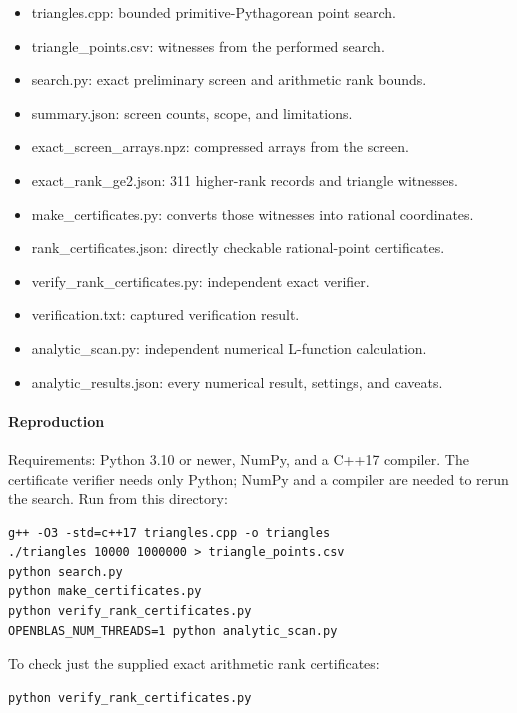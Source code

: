 \documentclass[11pt]{article}
\newcommand{\tightlist}{\setlength{\itemsep}{0pt}\setlength{\parskip}{0pt}}
\begin{document}
\begin{itemize}
\tightlist
\item
  triangles.cpp: bounded primitive-Pythagorean point search.
\item
  triangle\_points.csv: witnesses from the performed search.
\item
  search.py: exact preliminary screen and arithmetic rank bounds.
\item
  summary.json: screen counts, scope, and limitations.
\item
  exact\_screen\_arrays.npz: compressed arrays from the screen.
\item
  exact\_rank\_ge2.json: 311 higher-rank records and triangle witnesses.
\item
  make\_certificates.py: converts those witnesses into rational coordinates.
\item
  rank\_certificates.json: directly checkable rational-point certificates.
\item
  verify\_rank\_certificates.py: independent exact verifier.
\item
  verification.txt: captured verification result.
\item
  analytic\_scan.py: independent numerical L-function calculation.
\item
  analytic\_results.json: every numerical result, settings, and caveats.
\end{itemize}

\paragraph{Reproduction}

Requirements: Python 3.10 or newer, NumPy, and a C++17 compiler. The certificate verifier needs only Python; NumPy and a compiler are needed to rerun the search. Run from this directory:

\begin{Verbatim}[breaklines=true,breakanywhere=true,fontsize=\small]
g++ -O3 -std=c++17 triangles.cpp -o triangles
./triangles 10000 1000000 > triangle_points.csv
python search.py
python make_certificates.py
python verify_rank_certificates.py
OPENBLAS_NUM_THREADS=1 python analytic_scan.py
\end{Verbatim}

To check just the supplied exact arithmetic rank certificates:

\begin{Verbatim}[breaklines=true,breakanywhere=true,fontsize=\small]
python verify_rank_certificates.py
\end{Verbatim}
\end{document}

